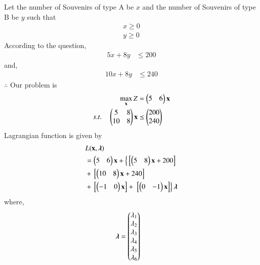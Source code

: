 
%
\begin{table}[!ht]
\centering
{}
\caption{Plywood Requirements}
\label{tab:table1}
\end{table}
Let the number of Souvenirs of type A be $x$ and the number of Souvenirs of type B be $y$  such that 
\begin{align}
    x \geq 0 \\
    y \geq 0 
\end{align}
According to the question,
\begin{align}
    5x+8y &\leq 200 
\end{align}
     and,
\begin{align}
    10x+8y &\leq 240 
\end{align}
$\therefore$ Our problem is
\begin{align}
        \max_{\mathbf{x}} Z &= \begin{pmatrix}5 & 6\end{pmatrix}\mathbf{x}\\
        s.t. \quad 
        \begin{pmatrix}5 & 8 \\ 10 & 8 \end{pmatrix}\mathbf{x} &\preceq \begin{pmatrix}200\\240\end{pmatrix} 
\end{align}
Lagrangian function is given by
\begin{equation}
\begin{aligned}
    &L(\mathbf{x},\boldsymbol{\lambda}) \\ &= \begin{pmatrix}5 & 6\end{pmatrix}\mathbf{x}+\left\{{}\left[\begin{pmatrix}5 & 8\end{pmatrix}\mathbf{x}+200\right]\right. \\ &+ {}\left[\begin{pmatrix}10 & 8\end{pmatrix}\mathbf{x}+240\right] \\ &+ {}\left[\begin{pmatrix}-1 & 0\end{pmatrix}\mathbf{x}\right] +\left.{}\left[\begin{pmatrix}0 & -1\end{pmatrix}\mathbf{x}\right]\right\}\boldsymbol{\lambda}
\end{aligned}
\end{equation}
where,
\begin{align}
    \boldsymbol{\lambda} &= \begin{pmatrix}\lambda_1 \\ \lambda_2 \\ \lambda_3 \\ \lambda_4 \\ \lambda_5 \\ \lambda_6\end{pmatrix}
\end{align}

